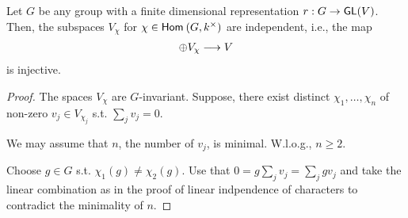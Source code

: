 \begin{lemma}
	Let $G$ be any group with a finite dimensional representation $r : G \overset{}{\rightarrow} \textsf{GL}(V)$. Then, the subspaces $V_\chi$ for $\chi \in \textsf{Hom}_{}\left(G, k^\times\right)$ are independent, i.e., the map
	\begin{align*}
	\oplus V_\chi \overset{}{\longrightarrow} V
	\end{align*}
	is injective.
\end{lemma}
\begin{proof}
The spaces $V_\chi$ are $G$-invariant. Suppose, there exist distinct $\chi_1, \ldots, \chi_n$ of non-zero $v_j \in V_{\chi_j}$ s.t. $\sum_j v_j = 0$.

We may assume that $n$, the number of $v_j$, is minimal. W.l.o.g., $n \geq 2$.

Choose $g \in G$ s.t. $\chi_1(g) \neq \chi_2(g)$. Use that $0 = g\sum_j v_j = \sum_j gv_j$ and take the linear combination as in the proof of linear indpendence of characters to contradict the minimality of $n$.
\end{proof}
